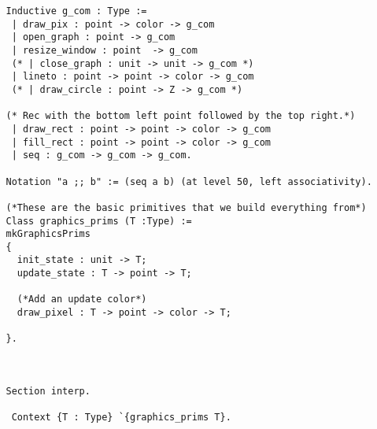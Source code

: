 \documentclass{llncs}
\begin{document}
\begin{lstlisting}
   Inductive g_com : Type :=
    | draw_pix : point -> color -> g_com
    | open_graph : point -> g_com
    | resize_window : point  -> g_com
    (* | close_graph : unit -> unit -> g_com *)
    | lineto : point -> point -> color -> g_com
    (* | draw_circle : point -> Z -> g_com *)

   (* Rec with the bottom left point followed by the top right.*)          
    | draw_rect : point -> point -> color -> g_com
    | fill_rect : point -> point -> color -> g_com
    | seq : g_com -> g_com -> g_com.

   Notation "a ;; b" := (seq a b) (at level 50, left associativity).

   (*These are the basic primitives that we build everything from*)
   Class graphics_prims (T :Type) :=
   mkGraphicsPrims
   {
     init_state : unit -> T;
     update_state : T -> point -> T;

     (*Add an update color*)
     draw_pixel : T -> point -> color -> T;

   }.



   Section interp.

    Context {T : Type} `{graphics_prims T}.
  \end{lstlisting}
\end{document}
